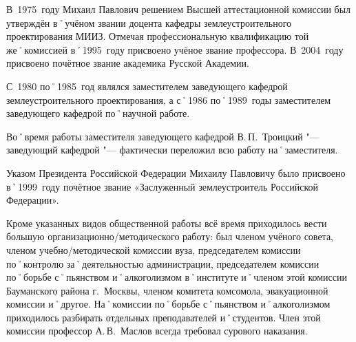 В~1975~году Михаил Павлович решением Высшей аттестационной комиссии был утверждён в˚учёном звании доцента кафедры землеустроительного проектирования МИИЗ. Отмечая профессиональную квалификацию той же˚комиссией в˚1995~году присвоено учёное звание профессора. В~2004~году присвоено почётное звание академика Русской Академии.

С~1980 по˚1985~год являлся заместителем заведующего кафедрой землеустроительного проектирования, а с˚1986 по˚1989~годы заместителем заведующего кафедрой по˚научной работе.

Во˚время работы заместителя заведующего кафедрой В.\,П.~Троицкий "--- заведующий кафедрой "--- фактически переложил всю работу на˚заместителя.

Указом Президента Российской Федерации Михаилу Павловичу было присвоено в˚1999~году почётное звание «Заслуженный землеустроитель Российской Федерации». 

Кроме указанных видов общественной работы всё время приходилось вести большую организационно\-/методического работу: был членом учёного совета, членом учебно\-/методической комиссии вуза, председателем комиссии по˚контролю за˚деятельностью администрации, председателем комиссии по˚борьбе с˚пьянством и˚алкоголизмом в˚институте и˚членом этой комиссии Бауманского района г.~Москвы, членом комитета комсомола, эвакуационной комиссии и˚другое. На˚комиссии по˚борьбе с˚пьянством и˚алкоголизмом приходилось разбирать отдельных преподавателей и˚студентов. Член этой комиссии профессор А.\,В.~Маслов всегда требовал сурового наказания.
